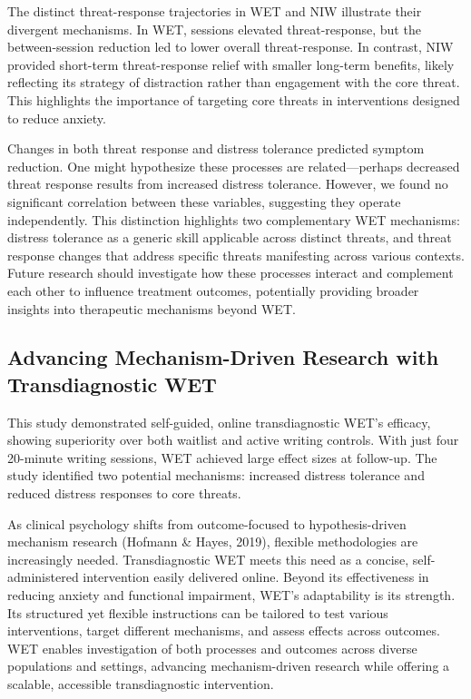 \documentclass[
  man,floatsintext]{apa7}
\begin{document}
The distinct threat-response trajectories in WET and NIW illustrate their divergent mechanisms.
In WET, sessions elevated threat-response, but the between-session reduction led to lower overall threat-response.
In contrast, NIW provided short-term threat-response relief with smaller long-term benefits, likely reflecting its strategy of distraction rather than engagement with the core threat.
This highlights the importance of targeting core threats in interventions designed to reduce anxiety.

Changes in both threat response and distress tolerance predicted symptom reduction.
One might hypothesize these processes are related---perhaps decreased threat response results from increased distress tolerance.
However, we found no significant correlation between these variables, suggesting they operate independently.
This distinction highlights two complementary WET mechanisms: distress tolerance as a generic skill applicable across distinct threats, and threat response changes that address specific threats manifesting across various contexts.
Future research should investigate how these processes interact and complement each other to influence treatment outcomes, potentially providing broader insights into therapeutic mechanisms beyond WET.

\subsection{Advancing Mechanism-Driven Research with Transdiagnostic WET}\label{advancing-mechanism-driven-research-with-transdiagnostic-wet}

This study demonstrated self-guided, online transdiagnostic WET's efficacy, showing superiority over both waitlist and active writing controls.
With just four 20-minute writing sessions, WET achieved large effect sizes at follow-up.
The study identified two potential mechanisms: increased distress tolerance and reduced distress responses to core threats.

As clinical psychology shifts from outcome-focused to hypothesis-driven mechanism research (Hofmann \& Hayes, 2019), flexible methodologies are increasingly needed.
Transdiagnostic WET meets this need as a concise, self-administered intervention easily delivered online.
Beyond its effectiveness in reducing anxiety and functional impairment, WET's adaptability is its strength.
Its structured yet flexible instructions can be tailored to test various interventions, target different mechanisms, and assess effects across outcomes.
WET enables investigation of both processes and outcomes across diverse populations and settings, advancing mechanism-driven research while offering a scalable, accessible transdiagnostic intervention.
\end{document}
